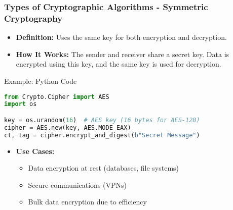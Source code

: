 \documentclass{beamer}
\begin{document}
\begin{frame}[fragile]
    \frametitle{Types of Cryptographic Algorithms - Symmetric Cryptography}
    \begin{itemize}
        \item \textbf{Definition:} Uses the same key for both encryption and decryption.
        \item \textbf{How It Works:} 
        The sender and receiver share a secret key. 
        Data is encrypted using this key, and the same key is used for decryption.
    \end{itemize}

    \begin{block}{Example: Python Code}
    \begin{lstlisting}[language=Python]
from Crypto.Cipher import AES
import os

key = os.urandom(16)  # AES key (16 bytes for AES-128)
cipher = AES.new(key, AES.MODE_EAX)
ct, tag = cipher.encrypt_and_digest(b"Secret Message")
    \end{lstlisting}
    \end{block}

    \begin{itemize}
        \item \textbf{Use Cases:}
        \begin{itemize}
            \item Data encryption at rest (databases, file systems)
            \item Secure communications (VPNs)
            \item Bulk data encryption due to efficiency
        \end{itemize}
    \end{itemize}
\end{frame}
\end{document}
